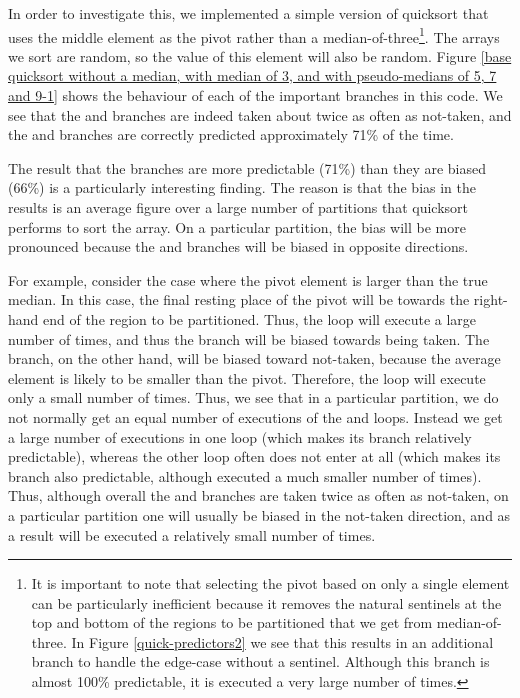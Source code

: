 In order to investigate this, we implemented a simple version of quicksort that
uses the middle element as the pivot rather than a median-of-three\footnote{It
is important to note that selecting the pivot based on only a single element can
be particularly inefficient because it removes the natural sentinels at the top
and bottom of the regions to be partitioned that we get from median-of-three. In
Figure \ref{quick-predictors2} we see that this results in an additional branch
to handle the edge-case without a sentinel. Although this branch is almost 100\%
predictable, it is executed a very large number of times.}. The arrays we sort
are random, so the value of this element will also be random. Figure \ref{base
quicksort without a median, with median of 3, and with pseudo-medians of 5, 7
and 9-1} shows the behaviour of each of the important branches in this code. We
see that the  and  branches are indeed taken about twice as often as
not-taken, and the  and  branches are correctly predicted
approximately 71\% of the time.

The result that the branches are more predictable (71\%) than they are biased
(66\%) is a particularly interesting finding. The reason is that the bias in the
results is an average figure over a large number of partitions that quicksort
performs to sort the array. On a particular partition, the bias will be more
pronounced because the  and  branches will be biased in opposite
directions.

For example, consider the case where the pivot element is larger than the true
median. In this case, the final resting place of the pivot will be towards the
right-hand end of the region to be partitioned. Thus, the  loop will
execute a large number of times, and thus the  branch will be biased
towards being taken. The  branch, on the other hand, will be biased toward
not-taken, because the average element is likely to be smaller than the pivot.
Therefore, the  loop will execute only a small number of times. Thus, we
see that in a particular partition, we do not normally get an equal number of
executions of the  and  loops. Instead we get a large number of
executions in one loop (which makes its branch relatively predictable), whereas
the other loop often does not enter at all (which makes its branch also
predictable, although executed a much smaller number of times). Thus, although
overall the  and  branches are taken twice as often as not-taken, on a
particular partition one will usually be biased in the not-taken direction, and
as a result will be executed a relatively small number of times.

